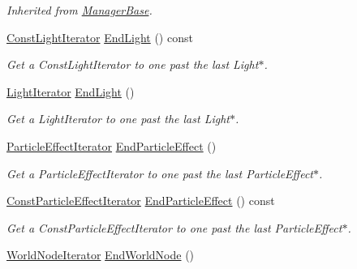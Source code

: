 \begin{DoxyCompactItemize}
\begin{DoxyCompactList}\small\item\em Inherited from \hyperlink{classphys_1_1ManagerBase}{ManagerBase}. \item\end{DoxyCompactList}\item 
\hyperlink{classphys_1_1SceneManager_a417c57b560317661d0c7d836a88f52ac}{ConstLightIterator} \hyperlink{classphys_1_1SceneManager_a606664d81c965a853dc1adf22c4559dc}{EndLight} () const 
\begin{DoxyCompactList}\small\item\em Get a ConstLightIterator to one past the last Light$\ast$. \item\end{DoxyCompactList}\item 
\hyperlink{classphys_1_1SceneManager_a2764b9082b4aecbf833c2f6e9f174ba0}{LightIterator} \hyperlink{classphys_1_1SceneManager_a4b44838cddfa710a538c02f3b261c3c7}{EndLight} ()
\begin{DoxyCompactList}\small\item\em Get a LightIterator to one past the last Light$\ast$. \item\end{DoxyCompactList}\item 
\hyperlink{classphys_1_1SceneManager_a668ef8db2053cc15cc48b21fa6240c3e}{ParticleEffectIterator} \hyperlink{classphys_1_1SceneManager_acc2e73606de2ecd452a0231473bfc2e6}{EndParticleEffect} ()
\begin{DoxyCompactList}\small\item\em Get a ParticleEffectIterator to one past the last ParticleEffect$\ast$. \item\end{DoxyCompactList}\item 
\hyperlink{classphys_1_1SceneManager_a0026f62b121b0d7010a67a79fdc9000c}{ConstParticleEffectIterator} \hyperlink{classphys_1_1SceneManager_ac06259a883a3d380334fe9b097e859f3}{EndParticleEffect} () const 
\begin{DoxyCompactList}\small\item\em Get a ConstParticleEffectIterator to one past the last ParticleEffect$\ast$. \item\end{DoxyCompactList}\item 
\hyperlink{classphys_1_1SceneManager_a67b62f6e9116423306b82e20cb2415fd}{WorldNodeIterator} \hyperlink{classphys_1_1SceneManager_aeac64d80d1fcad273efb1c1a8ca2380c}{EndWorldNode} ()

\end{DoxyCompactItemize}

